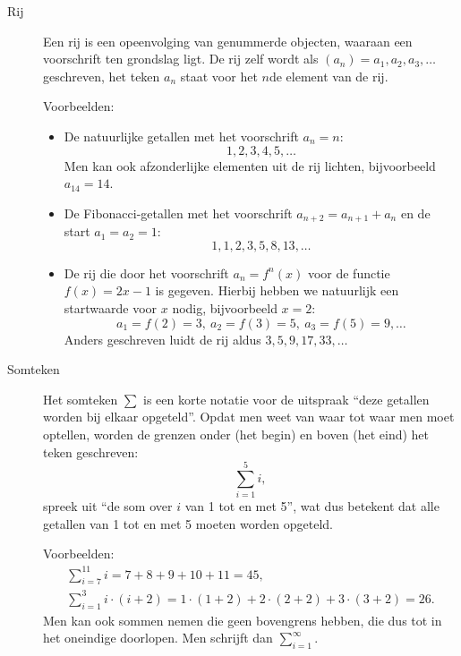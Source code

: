 \begin{description}
\clearpage

	\item[Rij] Een rij is een opeenvolging van genummerde objecten, waaraan een voorschrift ten grondslag ligt. De rij zelf wordt als $(a_n) = a_1,a_2,a_3,\dots$ geschreven, het teken $a_n$ staat voor het $n$de element van de rij.

	Voorbeelden:
	\begin{itemize}
		\item De natuurlijke getallen met het voorschrift $a_n = n$:
			\begin{equation*}
				1,2,3,4,5,\dotsc{}
			\end{equation*}
			Men kan ook afzonderlijke elementen uit de rij lichten, bij\-voorbeeld $a_{14} = 14$.
		\item De Fibonacci-getallen met het voorschrift $a_{n+2} = a_{n+1} + a_n$ en de start $a_1 = a_2 = 1$:
			\begin{equation*}
				1,1,2,3,5,8,13,\dotsc{}
			\end{equation*}
		\item De rij die door het voorschrift $a_n = f^n(x)$ voor de functie $f(x) = 2x-1$ is gegeven. Hierbij hebben we natuurlijk een startwaarde voor $x$ nodig, bijvoorbeeld $x=2$:
			\begin{equation*}
				a_1 = f(2) = 3,\ a_2 = f(3) = 5,\ a_3 = f(5) = 9,\dotsc
			\end{equation*}
			Anders geschreven luidt de rij aldus $3,5,9,17,33,\dotsc{}$
	\end{itemize}

	\item[Somteken] Het somteken $\sum$ is een korte notatie voor de uitspraak \enquote{deze getallen worden bij elkaar opgeteld}. Opdat men weet van waar tot waar men moet optellen, worden de grenzen onder (het begin) en boven (het eind) het teken geschreven:
		\begin{equation*}
			\sum\limits_{i=1}^5 i,
		\end{equation*}
		spreek uit \enquote{de som over $i$ van 1 tot en met 5}, wat dus betekent dat alle getallen van 1 tot en met 5 moeten worden opgeteld.

		Voorbeelden:
		\begin{gather*}
			\sum\limits_{i=7}^{11} i = 7+8+9+10+11 = 45,\\
			\sum\limits_{i=1}^3 i\cdot (i+2) = 1\cdot (1+2) + 2\cdot (2+2) + 3\cdot (3+2) = 26.
		\end{gather*}
		Men kan ook sommen nemen die geen bovengrens hebben, die dus tot in het oneindige doorlopen. Men schrijft dan $\sum\limits_{i=1}^\infty$.

\end{description}

